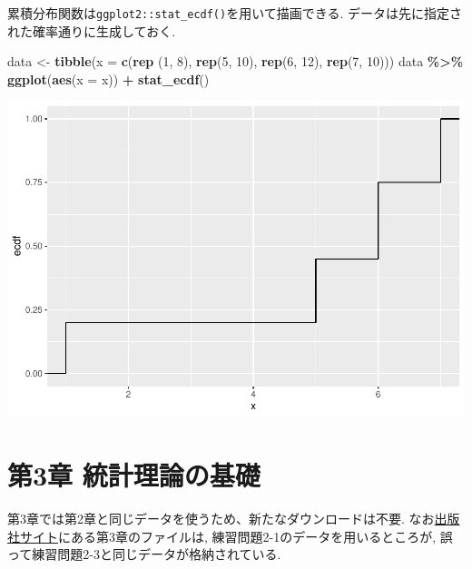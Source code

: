 \documentclass[
]{book}
\newenvironment{Shaded}{\begin{snugshade}}{\end{snugshade}}
\newcommand{\AttributeTok}[1]{\textcolor[rgb]{0.13,0.29,0.53}{#1}}
\newcommand{\DecValTok}[1]{\textcolor[rgb]{0.00,0.00,0.81}{#1}}
\newcommand{\FunctionTok}[1]{\textcolor[rgb]{0.13,0.29,0.53}{\textbf{#1}}}
\newcommand{\NormalTok}[1]{#1}
\newcommand{\OtherTok}[1]{\textcolor[rgb]{0.56,0.35,0.01}{#1}}
\newcommand{\SpecialCharTok}[1]{\textcolor[rgb]{0.81,0.36,0.00}{\textbf{#1}}}
\begin{document}
累積分布関数は\texttt{ggplot2::stat\_ecdf()}を用いて描画できる.
データは先に指定された確率通りに生成しておく.

\begin{Shaded}
\begin{Highlighting}[]
\NormalTok{data }\OtherTok{\textless{}{-}} \FunctionTok{tibble}\NormalTok{(}\AttributeTok{x =} \FunctionTok{c}\NormalTok{(}\FunctionTok{rep}\NormalTok{ (}\DecValTok{1}\NormalTok{, }\DecValTok{8}\NormalTok{), }\FunctionTok{rep}\NormalTok{(}\DecValTok{5}\NormalTok{, }\DecValTok{10}\NormalTok{), }\FunctionTok{rep}\NormalTok{(}\DecValTok{6}\NormalTok{, }\DecValTok{12}\NormalTok{), }\FunctionTok{rep}\NormalTok{(}\DecValTok{7}\NormalTok{, }\DecValTok{10}\NormalTok{)))}
\NormalTok{data }\SpecialCharTok{\%\textgreater{}\%}
    \FunctionTok{ggplot}\NormalTok{(}\FunctionTok{aes}\NormalTok{(}\AttributeTok{x =}\NormalTok{ x)) }\SpecialCharTok{+}
    \FunctionTok{stat\_ecdf}\NormalTok{()}
\end{Highlighting}
\end{Shaded}

\includegraphics{_main_files/figure-latex/unnamed-chunk-7-1.pdf}

\hypertarget{ch3}{%
\chapter*{第3章 統計理論の基礎}\label{ch3}}

第3章では第2章と同じデータを使うため、新たなダウンロードは不要.
なお\href{https://www.yuhikaku.co.jp/books/detail/9784641053854}{出版社サイト}にある第3章のファイルは, 練習問題2-1のデータを用いるところが, 誤って練習問題2-3と同じデータが格納されている.
\end{document}
